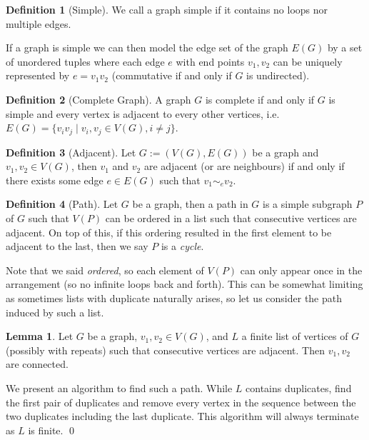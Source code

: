 \documentclass[
]{article}
\theoremstyle{definition}
\newtheorem{lemma}{Lemma}
\theoremstyle{definition}
\newtheorem{definition}{Definition}[section]
\begin{document}
\begin{definition}[Simple]
  We call a graph simple if it contains no loops nor multiple edges.
\end{definition}

If a graph is simple we can then model the edge set of the graph
\(E(G)\) by a set of unordered tuples where each edge \(e\) with end
points \(v_1, v_2\) can be uniquely represented by \(e = v_1 v_2\)
(commutative if and only if \(G\) is undirected).

\begin{definition}[Complete Graph]
  A graph \(G\) is complete if and only if \(G\) is simple and every vertex is 
  adjacent to every other vertices, i.e. 
  \(E(G) = \{v_i v_j \mid v_i, v_j \in V(G), i \neq j \}\).
\end{definition}

\begin{definition}[Adjacent]
  Let \(G := (V(G), E(G))\) be a graph and \(v_1, v_2 \in V(G)\), then \(v_1\) 
  and \(v_2\) are adjacent (or are neighbours) if and only if there exists some 
  edge \(e \in E(G)\) such that \(v_1 \sim_e v_2\).
\end{definition}

\begin{definition}[Path]
  Let \(G\) be a graph, then a path in \(G\) is a simple subgraph \(P\) of \(G\) 
  such that \(V(P)\) can be ordered in a list such that consecutive vertices are 
  adjacent. On top of this, if this ordering resulted in the first element to be 
  adjacent to the last, then we say \(P\) is a \textit{cycle}.
\end{definition}

Note that we said \emph{ordered}, so each element of \(V(P)\) can only
appear once in the arrangement (so no infinite loops back and forth).
This can be somewhat limiting as sometimes lists with duplicate
naturally arises, so let us consider the path induced by such a list.

\begin{lemma}\label{mk_path}
  Let \(G\) be a graph, \(v_1, v_2 \in V(G)\), and \(L\) a finite list of 
  vertices of \(G\) (possibly with repeats) such that consecutive vertices are 
  adjacent. Then \(v_1, v_2\) are connected.
\end{lemma}
\proof

We present an algorithm to find such a path. While \(L\) contains
duplicates, find the first pair of duplicates and remove every vertex in
the sequence between the two duplicates including the last duplicate.
This algorithm will always terminate as \(L\) is finite. \qed
\end{document}
